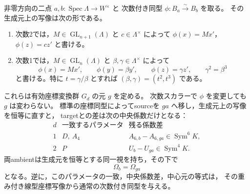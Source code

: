 \begin{lemma}[非零方向上の重み付き線型化]
\label{lem:nonzero-graded-isom-weighted-linear}
非零方向の二点 $a,b:\operatorname{Spec}\Lambda\to W^\times$ と
次数付き同型 $\phi:B_a\xrightarrow{\sim}B_b$ を取る。
その生成元上の写像は次の形である。
\begin{enumerate}
\item 次数2では，$M\in\operatorname{GL}_{n+1}(\Lambda)$ と
      $c\in\Lambda^\times$ によって
      $\phi(x)=Mx'$，$\phi(z)=cz'$ と書ける。
\item 次数1では，$M\in\operatorname{GL}_n(\Lambda)$ と
      $\beta,\gamma\in\Lambda^\times$ によって
      \[
       \phi(x)=Mx',\qquad \phi(y)=\beta y',\qquad
       \phi(z)=\gamma z',\qquad \gamma^2=\beta^3
      \]
      と書ける。特に $t=\gamma/\beta$ とすれば
      $(\beta,\gamma)=(t^2,t^3)$ である。
\end{enumerate}
これらは有効座標変換群 $G_d$ の元 $g$ を定める。
次数スカラーで $\phi$ を変更しても $g$ は変わらない。
標準の座標同型によってsourceを $ga$ へ移し，生成元上の写像を恒等に直すと，
targetとの差は次の中央係数だけとなる：
\[
 \begin{array}{c|c|c}
 d&\text{一致するパラメータ}&\text{残る係数差}\\\hline
 1&D,\ A_4&A_{6,b}-A_{6,ga}\in\operatorname{Sym}^6K,\\
 2&P&U_b-U_{ga}\in\operatorname{Sym}^4K.
 \end{array}
\]
両ambientは生成元を恒等とする同一視を持ち，その下で
\begin{equation}\label{eq:central-coefficient-arrow-equation}
                       \Omega_b=\Omega_{ga}
\end{equation}
となる。逆に，このパラメータの一致，中央係数差，中心元の等式は，
その重み付き線型座標写像から通常の次数付き同型を与える。
\end{lemma}
